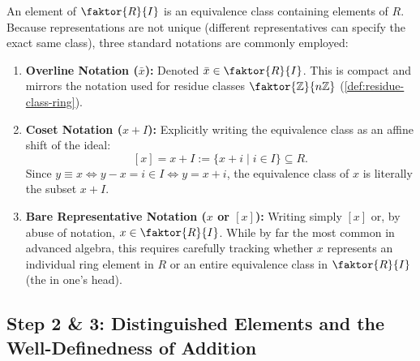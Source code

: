 \begin{content}
An element of $\faktor{R}{I}$ is an equivalence class containing elements of $R$. Because representations are not unique (different representatives can specify the exact same class), three standard notations are commonly employed:

\begin{enumerate}[label=\textbf{(\arabic*)}]
    \item \textbf{Overline Notation ($\bar{x}$):}
    Denoted $\bar{x} \in \faktor{R}{I}$. This is compact and mirrors the notation used for residue classes $\faktor{\mathbb{Z}}{n\mathbb{Z}}$ (\cref{def:residue-class-ring}).
    \item \textbf{Coset Notation ($x + I$):}
    Explicitly writing the equivalence class as an affine shift of the ideal:
    \begin{equation}\label{eq:coset-explicit-def}
    [x] = x + I := \{ x + i \mid i \in I \} \subseteq R.
    \end{equation}
    Since $y \equiv x \iff y - x = i \in I \iff y = x + i$, the equivalence class of $x$ is literally the subset $x + I$.
    \item \textbf{Bare Representative Notation ($x$ or $[x]$):}
    Writing simply $[x]$ or, by abuse of notation, $x \in \faktor{R}{I}$. While by far the most common in advanced algebra, this requires carefully tracking whether $x$ represents an individual ring element in $R$ or an entire equivalence class in $\faktor{R}{I}$ (the  in one's head).
\end{enumerate}
\end{content}

\subsection{Step 2 \& 3: Distinguished Elements and the Well-Definedness of Addition}

